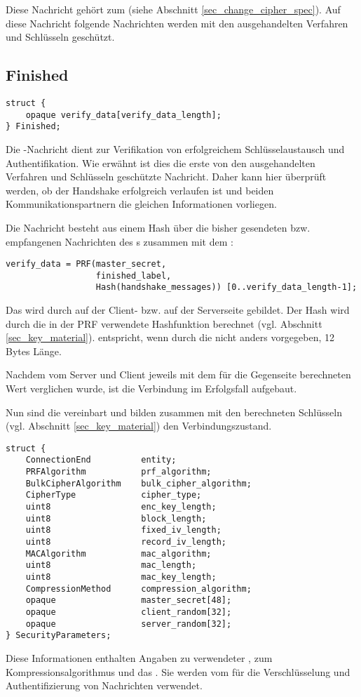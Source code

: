 Diese Nachricht gehört zum \changecipherspecprotocol{} (siehe Abschnitt \ref{sec_change_cipher_spec}). Auf diese Nachricht folgende Nachrichten werden mit den ausgehandelten Verfahren und Schlüsseln geschützt.

\subsection{Finished}

\begin{lstlisting}
struct {
	opaque verify_data[verify_data_length];
} Finished;
\end{lstlisting}

Die \finished{}-Nachricht dient zur Verifikation von erfolgreichem Schlüsselaustausch und Authentifikation. Wie erwähnt ist dies die erste von den ausgehandelten Verfahren und Schlüsseln geschützte Nachricht. Daher kann hier überprüft werden, ob der Handshake erfolgreich verlaufen ist und beiden Kommunikationspartnern die gleichen Informationen vorliegen.

Die Nachricht besteht aus einem Hash über die bisher gesendeten bzw. empfangenen Nachrichten des \handshakeprotocol{}s zusammen mit dem \mastersecret{}:

\begin{lstlisting}
verify_data = PRF(master_secret, 
				  finished_label, 
				  Hash(handshake_messages)) [0..verify_data_length-1];
\end{lstlisting}

Das  wird durch  auf der Client- bzw.  auf der Serverseite gebildet. Der Hash wird durch die in der PRF verwendete Hashfunktion berechnet (vgl. Abschnitt \ref{sec_key_material}).   entspricht, wenn durch die \ciphersuite{} nicht anders vorgegeben, 12 Bytes Länge.

Nachdem  vom Server und Client jeweils mit dem für die Gegenseite berechneten Wert verglichen wurde, ist die Verbindung im Erfolgsfall aufgebaut. 

Nun sind die  vereinbart und bilden zusammen mit den berechneten Schlüsseln (vgl. Abschnitt \ref{sec_key_material}) den Verbindungszustand. 
\begin{lstlisting}
struct {
	ConnectionEnd          entity;
	PRFAlgorithm           prf_algorithm;
	BulkCipherAlgorithm    bulk_cipher_algorithm;
	CipherType             cipher_type;
	uint8                  enc_key_length;
	uint8                  block_length;
	uint8                  fixed_iv_length;
	uint8                  record_iv_length;
	MACAlgorithm           mac_algorithm;
	uint8                  mac_length;
	uint8                  mac_key_length;
	CompressionMethod      compression_algorithm;
	opaque                 master_secret[48];
	opaque                 client_random[32];
	opaque                 server_random[32];
} SecurityParameters;
\end{lstlisting}
Diese Informationen enthalten Angaben zu verwendeter \ciphersuite{}, zum Kompressionsalgorithmus und das \mastersecret{}. Sie werden vom \recordprotocol{} für die Verschlüsselung und Authentifizierung von Nachrichten verwendet.

